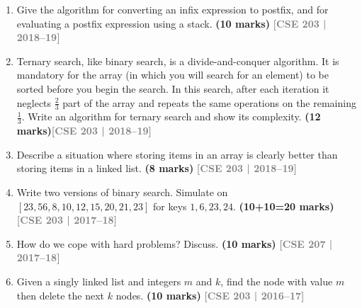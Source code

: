 \documentclass[12pt,a3paper]{article}
\newcommand{\yr}[1]{\hfill\textcolor{gray}{\small\textbf{[#1]}}}
\newcommand{\mk}[1]{\textcolor{orange!70!black}{\small\textbf{(#1 marks)}}}
\begin{document}
\begin{enumerate}
\item Give the algorithm for converting an infix expression to postfix, and
for evaluating a postfix expression using a stack. \mk{10}
\yr{CSE 203 | 2018--19}

\item Ternary search, like binary search, is a divide-and-conquer algorithm. It is
mandatory for the array (in which you will search for an element) to be sorted
before you begin the search. In this search, after each iteration it neglects
$\frac{2}{3}$ part of the array and repeats the same operations on the remaining
$\frac{1}{3}$. Write an algorithm for ternary search and show its complexity.
\mk{12}\yr{CSE 203 | 2018--19}

\item Describe a situation where storing items in an array is clearly better
than storing items in a linked list. \mk{8}
\yr{CSE 203 | 2018--19}

\item Write two versions of binary search. Simulate on $[23,56,8,10,12,15,
20,21,23]$ for keys $1, 6, 23, 24$. \mk{10+10=20}
\yr{CSE 203 | 2017--18}

\item How do we cope with hard problems? Discuss. \mk{10}
\yr{CSE 207 | 2017--18}

\item Given a singly linked list and integers $m$ and $k$, find the node with
value $m$ then delete the next $k$ nodes. \mk{10}
\yr{CSE 203 | 2016--17}



\end{enumerate}
\end{document}
